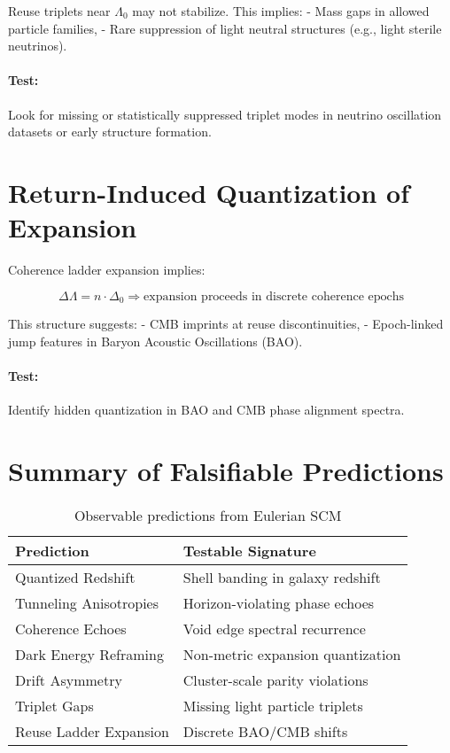 Reuse triplets near $\Lambda_0$ may not stabilize. This implies:
- Mass gaps in allowed particle families,
- Rare suppression of light neutral structures (e.g., light sterile neutrinos).

\paragraph{Test:} Look for missing or statistically suppressed triplet modes in neutrino oscillation datasets or early structure formation.

\section{Return-Induced Quantization of Expansion}

Coherence ladder expansion implies:

\[
\Delta \Lambda = n \cdot \Delta_0
\Rightarrow \text{expansion proceeds in discrete coherence epochs}
\]

This structure suggests:
- CMB imprints at reuse discontinuities,
- Epoch-linked jump features in Baryon Acoustic Oscillations (BAO).

\paragraph{Test:} Identify hidden quantization in BAO and CMB phase alignment spectra.

\section{Summary of Falsifiable Predictions}

\begin{table}[h!]
\centering
\begin{tabular}{|l|l|}
\hline
\textbf{Prediction} & \textbf{Testable Signature} \\
\hline
Quantized Redshift & Shell banding in galaxy redshift \\
Tunneling Anisotropies & Horizon-violating phase echoes \\
Coherence Echoes & Void edge spectral recurrence \\
Dark Energy Reframing & Non-metric expansion quantization \\
Drift Asymmetry & Cluster-scale parity violations \\
Triplet Gaps & Missing light particle triplets \\
Reuse Ladder Expansion & Discrete BAO/CMB shifts \\
\hline
\end{tabular}
\caption{Observable predictions from Eulerian SCM}
\end{table}

